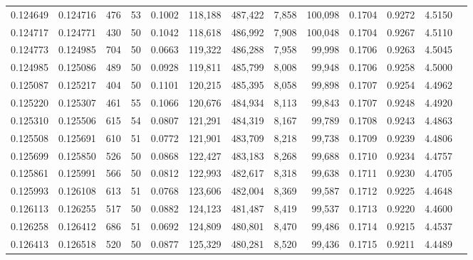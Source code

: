 \begin{tabular}{rrrrrrrrrrrrr}
0.124649 & 0.124716 &   476 &  53 &                                     0.1002 & 118,188 & 487,422 &   7,858 & 100,098 & 0.1704 & 0.9272 & 4.5150 \\
0.124717 & 0.124771 &   430 &  50 &                                     0.1042 & 118,618 & 486,992 &   7,908 & 100,048 & 0.1704 & 0.9267 & 4.5110 \\
0.124773 & 0.124985 &   704 &  50 &                                     0.0663 & 119,322 & 486,288 &   7,958 &  99,998 & 0.1706 & 0.9263 & 4.5045 \\
0.124985 & 0.125086 &   489 &  50 &                                     0.0928 & 119,811 & 485,799 &   8,008 &  99,948 & 0.1706 & 0.9258 & 4.5000 \\
0.125087 & 0.125217 &   404 &  50 &                                     0.1101 & 120,215 & 485,395 &   8,058 &  99,898 & 0.1707 & 0.9254 & 4.4962 \\
0.125220 & 0.125307 &   461 &  55 &                                     0.1066 & 120,676 & 484,934 &   8,113 &  99,843 & 0.1707 & 0.9248 & 4.4920 \\
0.125310 & 0.125506 &   615 &  54 &                                     0.0807 & 121,291 & 484,319 &   8,167 &  99,789 & 0.1708 & 0.9243 & 4.4863 \\
0.125508 & 0.125691 &   610 &  51 &                                     0.0772 & 121,901 & 483,709 &   8,218 &  99,738 & 0.1709 & 0.9239 & 4.4806 \\
0.125699 & 0.125850 &   526 &  50 &                                     0.0868 & 122,427 & 483,183 &   8,268 &  99,688 & 0.1710 & 0.9234 & 4.4757 \\
0.125861 & 0.125991 &   566 &  50 &                                     0.0812 & 122,993 & 482,617 &   8,318 &  99,638 & 0.1711 & 0.9230 & 4.4705 \\
0.125993 & 0.126108 &   613 &  51 &                                     0.0768 & 123,606 & 482,004 &   8,369 &  99,587 & 0.1712 & 0.9225 & 4.4648 \\
0.126113 & 0.126255 &   517 &  50 &                                     0.0882 & 124,123 & 481,487 &   8,419 &  99,537 & 0.1713 & 0.9220 & 4.4600 \\
0.126258 & 0.126412 &   686 &  51 &                                     0.0692 & 124,809 & 480,801 &   8,470 &  99,486 & 0.1714 & 0.9215 & 4.4537 \\
0.126413 & 0.126518 &   520 &  50 &                                     0.0877 & 125,329 & 480,281 &   8,520 &  99,436 & 0.1715 & 0.9211 & 4.4489 \\

\end{tabular}
